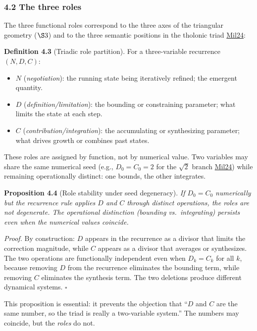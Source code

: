 \documentclass[
  11pt,
  letterpaper,
]{article}
\providecommand{\tightlist}{%
  \setlength{\itemsep}{0pt}\setlength{\parskip}{0pt}}
\begin{document}
\subsubsection{4.2 The three roles}\label{the-three-roles}

The three functional roles correspond to the three axes of the
triangular geometry (\(\S 3\)) and to the three semantic positions in
the tholonic triad \href{https://tholonia.github.io/the-book/}{Mil24}:

\textbf{Definition 4.3} (Triadic role partition). For a three-variable
recurrence \((N, D, C)\):

\begin{itemize}
\tightlist
\item
  \(N\) (\emph{negotiation}): the running state being iteratively
  refined; the emergent quantity.
\item
  \(D\) (\emph{definition/limitation}): the bounding or constraining
  parameter; what limits the state at each step.
\item
  \(C\) (\emph{contribution/integration}): the accumulating or
  synthesizing parameter; what drives growth or combines past states.
\end{itemize}

These roles are assigned by function, not by numerical value. Two
variables may share the same numerical seed (e.g., \(D_0 = C_0 = 2\) for
the \(\sqrt{2}\) branch
\href{https://tholonia.github.io/the-book/}{Mil24}) while remaining
operationally distinct: one bounds, the other integrates.

\textbf{Proposition 4.4} (Role stability under seed degeneracy).
\emph{If \(D_0 = C_0\) numerically but the recurrence rule applies \(D\)
and \(C\) through distinct operations, the roles are not degenerate. The
operational distinction (bounding vs.~integrating) persists even when
the numerical values coincide.}

\emph{Proof.} By construction: \(D\) appears in the recurrence as a
divisor that limits the correction magnitude, while \(C\) appears as a
divisor that averages or synthesizes. The two operations are
functionally independent even when \(D_k = C_k\) for all \(k\), because
removing \(D\) from the recurrence eliminates the bounding term, while
removing \(C\) eliminates the synthesis term. The two deletions produce
different dynamical systems. \(\square\)

This proposition is essential: it prevents the objection that ``\(D\)
and \(C\) are the same number, so the triad is really a two-variable
system.'' The numbers may coincide, but the \emph{roles} do not.
\end{document}
